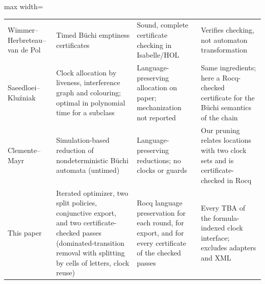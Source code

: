 \begin{table}[t]
\begin{adjustbox}{max width=\textwidth}
\begin{tabular}{@{}>{\raggedright\arraybackslash}p{}>{\raggedright\arraybackslash}p{}>{\raggedright\arraybackslash}p{}>{\raggedright\arraybackslash}p{}@{}}
Wimmer--Herbreteau--van de Pol~\cite{wimmer_herbreteau_vandepol_formats2020} & Timed B\"uchi emptiness certificates & Sound, complete certificate checking in Isabelle/HOL & Verifies checking, not automaton transformation\\
Saeedloei--Kluźniak~\cite{saeedloei_kluzniak_hscc2018} & Clock allocation by liveness, interference graph and colouring; optimal in polynomial time for a subclass & Language-preserving allocation on paper; mechanization not reported & Same ingredients; here a Rocq-checked certificate for the Büchi semantics of the chain\\
Clemente--Mayr~\cite{clemente_mayr_lmcs19} & Simulation-based reduction of nondeterministic Büchi automata (untimed) & Language-preserving reductions; no clocks or guards & Our pruning relates locations with two clock sets and is certificate-checked in Rocq\\
This paper & Iterated optimizer, two split policies, conjunctive export, and two certificate-checked passes (dominated-transition removal with splitting by cells of letters, clock reuse) & Rocq language preservation for each round, for export, and for every certificate of the checked passes & Every TBA of the formula-indexed clock interface; excludes adapters and XML\\
\bottomrule
\end{tabular}\end{adjustbox}
\end{table}

